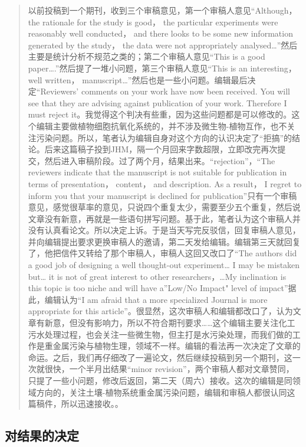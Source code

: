 \documentclass[]{book}
\begin{document}
\begin{quote}
以前投稿到一个期刊，收到三个审稿意见，第一个审稿人意见``Although， the rationale for the study is good， the particular experiments were reasonably well conducted， and there looks to be some new information generated by the study， the data were not appropriately analysed\ldots{}''然后主要是统计分析不规范之类的；第二个审稿人意见``This is a good paper\ldots{}.''然后提了一堆小问题，第三个审稿人意见``This is an interesting， well written， manuscript\ldots{}''然后也是一些小问题。编辑最后决定``Reviewers' comments on your work have now been received. You will see that they are advising against publication of your work. Therefore I must reject it。我觉得这个判决有些重，因为这些问题都是可以修改的。这个编辑主要做植物细胞抗氧化系统的，并不涉及微生物-植物互作，也不关注污染问题。所以，笔者认为编辑自身对这个方向的认识决定了``拒搞''的结论。后来这篇稿子投到JHM，隔一个月回来字数超限，立即改完再次提交，然后进入审稿阶段。过了两个月，结果出来。``rejection''，``The reviewers indicate that the manuscript is not suitable for publication in terms of presentation， content， and description. As a result， I regret to inform you that your manuscript is declined for publication''只有一个审稿意见，感觉很草率的意见，只说四个重复太少，需要至少五个重复，然后说文章没有新意，再就是一些语句拼写问题。基于此，笔者认为这个审稿人并没有认真看论文。所以决定上诉。于是当天写完反驳信，回复审稿人意见，并向编辑提出要求更换审稿人的邀请，第二天发给编辑。编辑第三天就回复了，他把信件又转给了那个审稿人，审稿人这回又改口了``The authors did a good job of designing a well thought-out experiment\ldots{} I may be mistaken but\ldots{} it is not of great interest to other researchers，\ldots{}My inclination is this topic is too niche and will have a''Low/No Impact" level of impact''据此，编辑认为``I am afraid that a more specialized Journal is more appropriate for this article''。很显然，这次审稿人和编辑都改口了，认为文章有新意，但没有影响力，所以不符合期刊要求\ldots{}\ldots{}这个编辑主要关注化工污水处理过程，也会关注一些微生物，但主打是水污染处理，而我们做的工作是重金属污染与植物生理，领域不一样。编辑的看法再一次决定了文章的命运。之后，我们再仔细改了一遍论文，然后继续投稿到另一个期刊，这一次就很快，一个半月出结果``minor revision''，两个审稿人都对文章赞同，只提了一些小问题，修改后返回，第二天（周六）接收。这次的编辑是同领域方向的，关注土壤-植物系统重金属污染问题，编辑和审稿人都很认同这篇稿件，所以迅速接收。。
\end{quote}

\hypertarget{ux5bf9ux7ed3ux679cux7684ux51b3ux5b9a}{%
\subsection{对结果的决定}\label{ux5bf9ux7ed3ux679cux7684ux51b3ux5b9a}}
\end{document}
